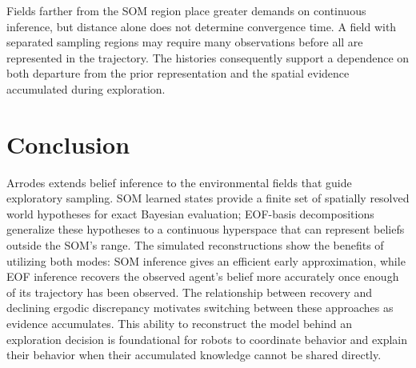 \documentclass[letterpaper,10pt,conference]{ieeeconf}
\begin{document}
Fields farther from the SOM region place greater demands on continuous inference, but distance alone does not determine convergence time. A field with separated sampling regions may require many observations before all are represented in the trajectory. The histories consequently support a dependence on both departure from the prior representation and the spatial evidence accumulated during exploration.







% 



\section{Conclusion}

Arrodes extends belief inference to the environmental fields that guide exploratory sampling. SOM learned states provide a finite set of spatially resolved world hypotheses for exact Bayesian evaluation; EOF-basis decompositions generalize these hypotheses to a continuous hyperspace that can represent beliefs outside the SOM's range. The simulated reconstructions show the benefits of utilizing both modes: SOM inference gives an efficient early approximation, while EOF inference recovers the observed agent's belief more accurately once enough of its trajectory has been observed. The relationship between recovery and declining ergodic discrepancy motivates switching between these approaches as evidence accumulates. This ability to reconstruct the model behind an exploration decision is foundational for robots to coordinate behavior and explain their behavior when their accumulated knowledge cannot be shared directly.
\end{document}

